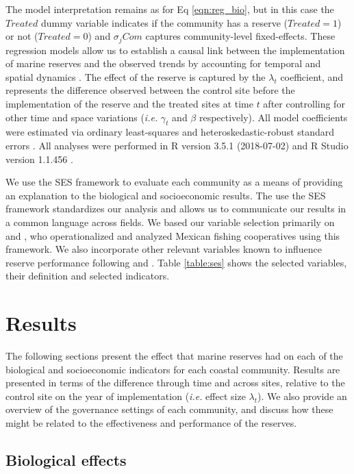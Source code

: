 \documentclass{frontiersSCNS}
\begin{document}
The model interpretation remains as for Eq \ref{eqn:reg_bio}, but in
this case the \(Treated\) dummy variable indicates if the community has
a reserve (\(Treated = 1\)) or not (\(Treated = 0\)) and \(\sigma_jCom\)
captures community-level fixed-effects. These regression models allow us
to establish a causal link between the implementation of marine reserves
and the observed trends by accounting for temporal and spatial dynamics
\citep{depalma_2018}. The effect of the reserve is captured by the
\(\lambda_t\) coefficient, and represents the difference observed
between the control site before the implementation of the reserve and
the treated sites at time \(t\) after controlling for other time and
space variations (\emph{i.e.} \(\gamma_t\) and \(\beta\) respectively).
All model coefficients were estimated via ordinary least-squares and
heteroskedastic-robust standard errors \citep{zeileis_2004-7n}. All
analyses were performed in R version 3.5.1 (2018-07-02) and R Studio
version 1.1.456 \citep{R_2018}.

We use the SES framework to evaluate each community as a means of
providing an explanation to the biological and socioeconomic results.
The use the SES framework standardizes our analysis and allows us to
communicate our results in a common language across fields. We based our
variable selection primarily on \citet{leslie_2015-na} and
\citet{basurto_2013-oq}, who operationalized and analyzed Mexican
fishing cooperatives using this framework. We also incorporate other
relevant variables known to influence reserve performance following
\citet{difranco_2016-Xw} and \citet{edgar_2014-UO}. Table
\ref{table:ses} shows the selected variables, their definition and
selected indicators.

\section{Results}\label{results}

The following sections present the effect that marine reserves had on
each of the biological and socioeconomic indicators for each coastal
community. Results are presented in terms of the difference through time
and across sites, relative to the control site on the year of
implementation (\emph{i.e.} effect size \(\lambda_t\)). We also provide
an overview of the governance settings of each community, and discuss
how these might be related to the effectiveness and performance of the
reserves.

\subsection{Biological effects}\label{biological-effects}
\end{document}
